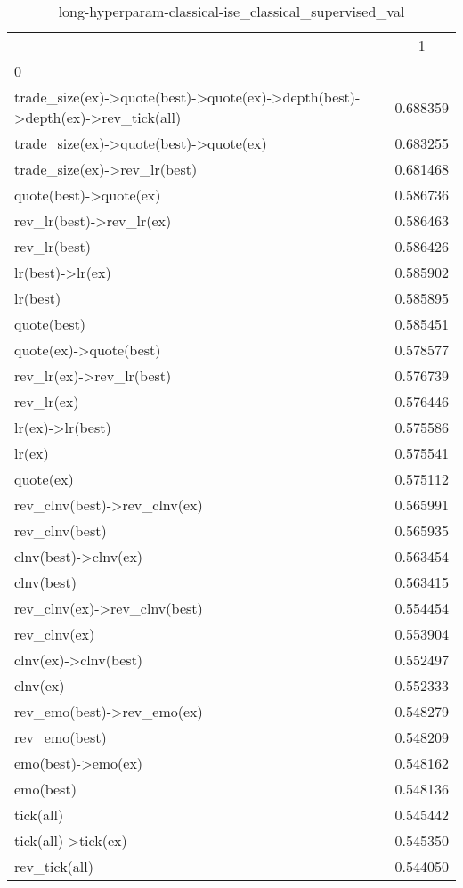 \begin{table}
\centering
\caption[short-hyperparam-classical-ise_classical_supervised_val]{long-hyperparam-classical-ise_classical_supervised_val}
\label{tab:hyperparam-classical-ise_classical_supervised_val}
\begin{tabular}{lS}
\toprule
{} & {1} \\
{0} & {} \\
\midrule
trade_size(ex)->quote(best)->quote(ex)->depth(best)->depth(ex)->rev_tick(all) & 0.688359 \\
trade_size(ex)->quote(best)->quote(ex) & 0.683255 \\
trade_size(ex)->rev_lr(best) & 0.681468 \\
quote(best)->quote(ex) & 0.586736 \\
rev_lr(best)->rev_lr(ex) & 0.586463 \\
rev_lr(best) & 0.586426 \\
lr(best)->lr(ex) & 0.585902 \\
lr(best) & 0.585895 \\
quote(best) & 0.585451 \\
quote(ex)->quote(best) & 0.578577 \\
rev_lr(ex)->rev_lr(best) & 0.576739 \\
rev_lr(ex) & 0.576446 \\
lr(ex)->lr(best) & 0.575586 \\
lr(ex) & 0.575541 \\
quote(ex) & 0.575112 \\
rev_clnv(best)->rev_clnv(ex) & 0.565991 \\
rev_clnv(best) & 0.565935 \\
clnv(best)->clnv(ex) & 0.563454 \\
clnv(best) & 0.563415 \\
rev_clnv(ex)->rev_clnv(best) & 0.554454 \\
rev_clnv(ex) & 0.553904 \\
clnv(ex)->clnv(best) & 0.552497 \\
clnv(ex) & 0.552333 \\
rev_emo(best)->rev_emo(ex) & 0.548279 \\
rev_emo(best) & 0.548209 \\
emo(best)->emo(ex) & 0.548162 \\
emo(best) & 0.548136 \\
tick(all) & 0.545442 \\
tick(all)->tick(ex) & 0.545350 \\
rev_tick(all) & 0.544050 \\

\end{tabular}
\end{table}
